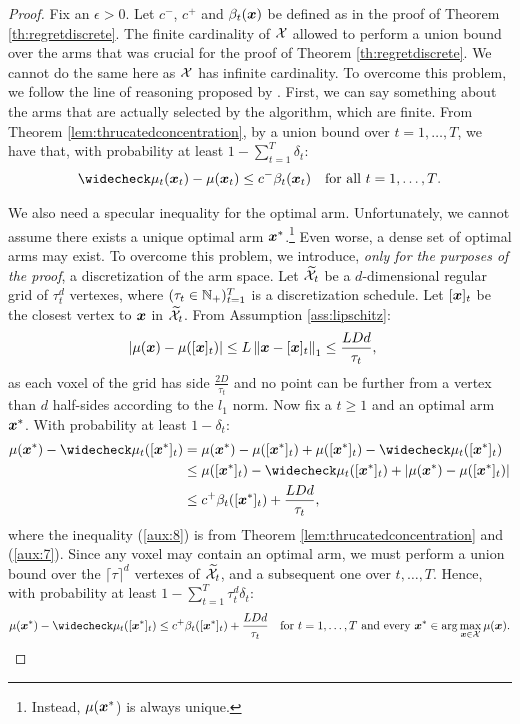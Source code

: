 \regretcompact*
\begin{proof}
	Fix an $\epsilon>0$. Let $c^{-}$, $c^{+}$ and $\beta_t(\vx)$ be defined as in the proof of Theorem \ref{th:regretdiscrete}.
	The finite cardinality of $\Xspace$ allowed to perform a union bound over the arms that was crucial for the proof of Theorem \ref{th:regretdiscrete}. We cannot do the same here as $\Xspace$ has infinite cardinality. To overcome this problem, we follow the line of reasoning proposed by \cite{srinivas2010gaussian}. First, we can say something about the arms that are actually selected by the algorithm, which are finite. From Theorem \ref{lem:thrucatedconcentration}, by a union bound over $t=1,\dots,T$, we have that, with probability at least $1-\sum_{t=1}^T\delta_t$:
	\begin{align}\label{aux:6}
		&\wc{\mu_t}(\vx_t) - \mu(\vx_t) \leq c^{-}\beta_t(\vx_t) &\text{for all $t=1,\dots,T$}.
	\end{align}
	
	We also need a specular inequality for the optimal arm. Unfortunately, we cannot assume there exists a unique optimal arm $\vx^*$.\footnote{Instead, $\mu(\vx^*$) is always unique.} Even worse, a dense set of optimal arms may exist. To overcome this problem, we introduce, \textit{only for the purposes of the proof}, a discretization of the arm space. Let $\wt{\Xspace}_t$ be a $d$-dimensional regular grid of $\tau_t^d$ vertexes, where $(\tau_t\in\Naturals_{+})_{t=1}^T$ is a discretization schedule. Let $[\vx]_t$ be the closest vertex to $\vx$ in $\wt{\Xspace}_t$. From Assumption \ref{ass:lipschitz}:
	\begin{align}\label{aux:7}
		&|\mu(\vx) - \mu([\vx]_t)| \leq L\norm[1]{\vx - [\vx]_t} \leq \frac{LDd}{\tau_t},
	\end{align}
	as each voxel of the grid has side $\frac{2D}{\tau_t}$ and no point can be further from a vertex than $d$ half-sides according to the $l_1$ norm. Now fix a $t\geq1$ and an optimal arm $\vx^*$. With probability at least $1-\delta_t$:
	\begin{align}
		\mu(\vx^*) - \wc{\mu}_t([\vx^*]_t) 
		&= \mu(\vx^*) - \mu([\vx^*]_t) + \mu([\vx^*]_t) - \wc{\mu}_t([\vx^*]_t)  \nonumber\\
		&\leq \mu([\vx^*]_t) - \wc{\mu}_t([\vx^*]_t) + |\mu(\vx^*) - \mu([\vx^*]_t)| \nonumber\\
		&\leq c^{+}\beta_t([\vx^*]_t) + \frac{LDd}{\tau_t}, \label{aux:8}
	\end{align}
	where the inequality (\ref{aux:8}) is from Theorem \ref{lem:thrucatedconcentration} and (\ref{aux:7}). Since any voxel may contain an optimal arm, we must perform a union bound over the $\lceil\tau\rceil^d$ vertexes of $\wt{\Xspace}_t$, and a subsequent one over $t,\dots,T$. Hence, with probability at least $1-\sum_{t=1}^{T}\tau_t^d\delta_t$:
	\begin{align}\label{aux:9}
		&\mu(\vx^*) - \wc{\mu}_t([\vx^*]_t) \leq c^{+}\beta_t([\vx^*]_t) + \frac{LDd}{\tau_t} &\text{for $t=1,\dots,T$ and every $\vx^*\in\arg\max_{\vx\in\Xspace}\mu(\vx)$}.
	\end{align}
	

\end{proof}
